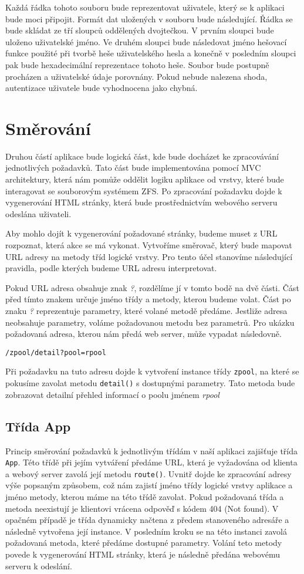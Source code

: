     Každá řádka tohoto souboru bude reprezentovat uživatele, který se k aplikaci bude moci připojit. Formát dat uložených v souboru bude následující. Řádka se bude skládat ze tří sloupců oddělených dvojtečkou. V prvním sloupci bude uloženo uživatelské jméno. Ve druhém sloupci bude následovat jméno hešovací funkce použité při tvorbě heše uživatelského hesla a konečně v posledním sloupci pak bude hexadecimální reprezentace tohoto heše. Soubor bude postupně procházen a uživatelské údaje porovnány. Pokud nebude nalezena shoda, autentizace uživatele bude vyhodnocena jako chybná.
\section{Směrování}
\label{route}
Druhou částí aplikace bude logická část, kde bude docházet ke zpracovávání jednotlivých požadavků. Tato část bude implementována pomocí MVC architektury, která nám pomůže oddělit logiku aplikace od vrstvy, které bude interagovat se souborovým systémem ZFS. Po zpracování požadavku dojde k vygenerování HTML stránky, která bude prostřednictvím webového serveru odeslána uživateli.

Aby mohlo dojít k vygenerování požadované stránky, budeme muset z URL rozpoznat, která akce se má vykonat. Vytvoříme směrovač, který bude mapovat URL adresy na metody tříd logické vrstvy. Pro tento účel stanovíme následující pravidla, podle kterých budeme URL adresu interpretovat.

Pokud URL adresa obsahuje znak \emph{?}, rozdělíme jí v tomto bodě na dvě části. Část před tímto znakem určuje jméno třídy a metody, kterou budeme volat. Část po znaku \emph{?} reprezentuje parametry, které volané metodě předáme. Jestliže adresa neobsahuje parametry, voláme požadovanou metodu bez parametrů. Pro ukázku požadovaná adresa, kterou nám předá web server, může vypadat následovně.
\begin{verbatim}
/zpool/detail?pool=rpool
\end{verbatim}
Při požadavku na tuto adresu dojde k vytvoření instance třídy \verb|zpool|, na které se pokusíme zavolat metodu \verb|detail()| s dostupnými parametry. Tato metoda bude zobrazovat detailní přehled informací o poolu jménem \emph{rpool}
    \subsection{Třída App}
    Princip směrování požadavků k jednotlivým třídám v naší aplikaci zajišťuje třída \verb|App|. Této třídě při jejím vytváření předáme URL, která je vyžadována od klienta a webový server zavolá její metodu \verb|route()|. Uvnitř dojde ke zpracování adresy výše popsaným způsobem, což nám zajistí jméno třídy logické vrstvy aplikace a jméno metody, kterou máme na této třídě zavolat. Pokud požadovaná třída a metoda neexistují je klientovi vrácena odpověď s kódem 404 (Not found). V opačném případě je třída dynamicky načtena z předem stanoveného adresáře a následně vytvořena její instance. V posledním kroku se na této instanci zavolá požadovaná metoda, které předáme dostupné parametry. Volání teto metody povede k vygenerování HTML stránky, která je následně předána webovému serveru k odeslání.

